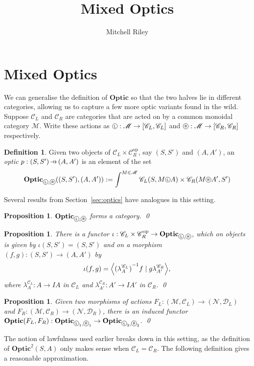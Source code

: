 \documentclass[11pt,letterpaper]{article}
\title{Mixed Optics}
\author{Mitchell Riley}
\affil{Wesleyan University \\ \texttt{mvriley@wesleyan.edu}}
\theoremstyle{plain}
\newtheorem{proposition}[theorem]{Proposition}
\theoremstyle{definition}
\newtheorem{definition}[theorem]{Definition}
\newcommand{\C}{\mathscr{C}}
\newcommand{\D}{\mathscr{D}}
\newcommand{\M}{\mathscr{M}}
\newcommand{\N}{\mathscr{N}}
\newcommand{\Optic}{\mathbf{Optic}}
\newcommand{\Twoptic}{\mathbf{Optic}^2}
\newcommand{\op}{\mathrm{op}}
\newcommand*\circled[1]{\tikz[baseline={([yshift=-0.65ex]current bounding box.center)}]{
   \node[shape=circle,draw,inner sep=1pt] (char) {#1};}}
\newcommand{\actL}{{\circled{\tiny$\mathsf{L}$}}}
\newcommand{\actR}{{\circled{\tiny$\mathsf{R}$}}}
\newcommand{\rep}[2]{{\ensuremath \left\langle #1 \mid #2 \right\rangle}}
\newcommand{\hto}{\ensuremath{\,\mathaccent\shortmid\rightarrow\,}}
\begin{document}
\maketitle

\section{Mixed Optics}\label{sec:mixed-optics}

We can generalise the definition of $\Optic$ so that the two halves lie in different categories, allowing us to capture a few more optic variants found in the wild. Suppose $\C_L$ and $\C_R$ are categories that are acted on by a common monoidal category $\M$. Write these actions as $\actL : \M \to [\C_L, \C_L]$ and $\actR : \M \to [\C_R, \C_R]$ respectively.

\begin{definition}
  Given two objects of $\C_L \times \C_R^\op$, say $(S, S')$ and $(A, A')$, an \emph{optic} $p : (S, S') \hto (A, A')$ is an element of the set
  \begin{align*}
    \Optic_{\actL, \actR}((S, S'), (A, A')) := \int^{M \in \M} \C_L(S, M \actL A) \times \C_R(M \actR A', S')
  \end{align*}
\end{definition}

Several results from Section~\ref{sec:optics} have analogues in this setting.
\begin{proposition}\label{prop:mixed-optic-is-cat}
  $\Optic_{\actL, \actR}$ forms a category. \qed
\end{proposition}
\begin{proposition}
  There is a functor $\iota : \C_L \times \C_R^\op \to \Optic_{\actL, \actR}$, which on objects is given by $\iota(S, S') = (S, S')$ and on a morphism $(f, g) : (S, S') \to (A, A')$ by \[\iota(f, g) = \rep{{(\lambda^{\C_L}_A)}^{-1} f}{g \lambda^{\C_R}_{A'}},\] where $\lambda^{\C_L}_A : A \to IA$ in $\C_L$ and $\lambda^{\C_R}_{A'} : A' \to IA'$ in $\C_R$. \qed
\end{proposition}
\begin{proposition}\label{prop:mixed-change-of-action}
  Given two morphisms of actions $F_L : (\M, \C_L) \to (\N, \D_L)$ and $F_R : (\M, \C_R) \to (\N, \D_R)$, there is an induced functor $\Optic(F_L, F_R) : \Optic_{\actL_1, \actR_1} \to \Optic_{\actL_2, \actR_2}$. \qed
\end{proposition}

The notion of lawfulness used earlier breaks down in this setting, as the definition of $\Twoptic(S, A)$ only makes sense when $\C_L = \C_R$. The following definition gives a reasonable approximation.
\end{document}
